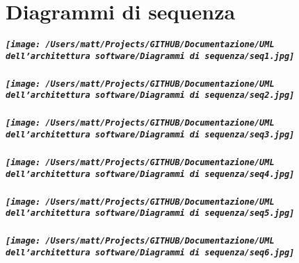 \chapter{Diagrammi di sequenza}

\centering
\paragraph{
    \texttt{[image: /Users/matt/Projects/GITHUB/Documentazione/UML dell'architettura software/Diagrammi di sequenza/seq1.jpg]}
}

\paragraph{
    \texttt{[image: /Users/matt/Projects/GITHUB/Documentazione/UML dell'architettura software/Diagrammi di sequenza/seq2.jpg]}
}

\paragraph{
    \texttt{[image: /Users/matt/Projects/GITHUB/Documentazione/UML dell'architettura software/Diagrammi di sequenza/seq3.jpg]}
}

\paragraph{
    \texttt{[image: /Users/matt/Projects/GITHUB/Documentazione/UML dell'architettura software/Diagrammi di sequenza/seq4.jpg]}
}

\paragraph{
    \texttt{[image: /Users/matt/Projects/GITHUB/Documentazione/UML dell'architettura software/Diagrammi di sequenza/seq5.jpg]}
}

\paragraph{
    \texttt{[image: /Users/matt/Projects/GITHUB/Documentazione/UML dell'architettura software/Diagrammi di sequenza/seq6.jpg]}
}